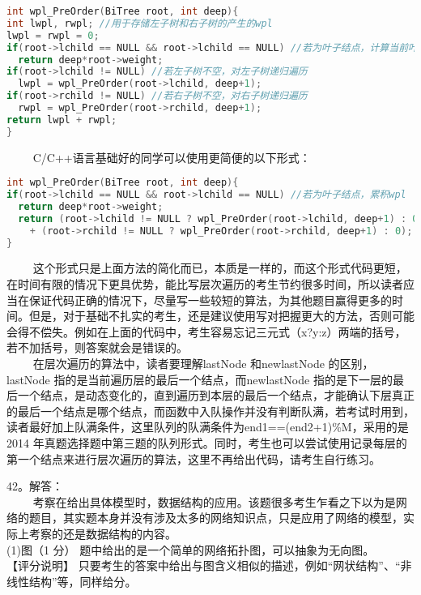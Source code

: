 \begin{lstlisting}[language=cpp]
int wpl_PreOrder(BiTree root, int deep){
int lwpl, rwpl; //用于存储左子树和右子树的产生的wpl
lwpl = rwpl = 0;
if(root->lchild == NULL && root->lchild == NULL) //若为叶子结点，计算当前叶子结点的wpl
  return deep*root->weight;
if(root->lchild != NULL) //若左子树不空，对左子树递归遍历
  lwpl = wpl_PreOrder(root->lchild, deep+1);
if(root->rchild != NULL) //若右子树不空，对右子树递归遍历
  rwpl = wpl_PreOrder(root->rchild, deep+1);
return lwpl + rwpl;
}
\end{lstlisting}
$\qquad$ C/C++语言基础好的同学可以使用更简便的以下形式：
\begin{lstlisting}[language=cpp]
int wpl_PreOrder(BiTree root, int deep){
if(root->lchild == NULL && root->lchild == NULL) //若为叶子结点，累积wpl
  return deep*root->weight;
  return (root->lchild != NULL ? wpl_PreOrder(root->lchild, deep+1) : 0)
    + (root->rchild != NULL ? wpl_PreOrder(root->rchild, deep+1) : 0);
}
\end{lstlisting}
$\qquad$ 这个形式只是上面方法的简化而已，本质是一样的，而这个形式代码更短，在时间有限的情况下更具优势，能比写层次遍历的考生节约很多时间，所以读者应当在保证代码正确的情况下，尽量写一些较短的算法，为其他题目赢得更多的时间。但是，对于基础不扎实的考生，还是建议使用写对把握更大的方法，否则可能会得不偿失。例如在上面的代码中，考生容易忘记三元式（x?y:z）两端的括号，若不加括号，则答案就会是错误的。 \\
$\qquad$ 在层次遍历的算法中，读者要理解lastNode 和newlastNode 的区别，lastNode 指的是当前遍历层的最后一个结点，而newlastNode 指的是下一层的最后一个结点，是动态变化的，直到遍历到本层的最后一个结点，才能确认下层真正的最后一个结点是哪个结点，而函数中入队操作并没有判断队满，若考试时用到，读者最好加上队满条件，这里队列的队满条件为end1==(end2+1)\%M，采用的是2014 年真题选择题中第三题的队列形式。同时，考生也可以尝试使用记录每层的第一个结点来进行层次遍历的算法，这里不再给出代码，请考生自行练习。

42。解答： \\
$\qquad$ 考察在给出具体模型时，数据结构的应用。该题很多考生乍看之下以为是网络的题目，其实题本身并没有涉及太多的网络知识点，只是应用了网络的模型，实际上考察的还是数据结构的内容。 \\

(1)图（1 分）
题中给出的是一个简单的网络拓扑图，可以抽象为无向图。 \\
【评分说明】 只要考生的答案中给出与图含义相似的描述，例如“网状结构”、“非线性结构”等，同样给分。

